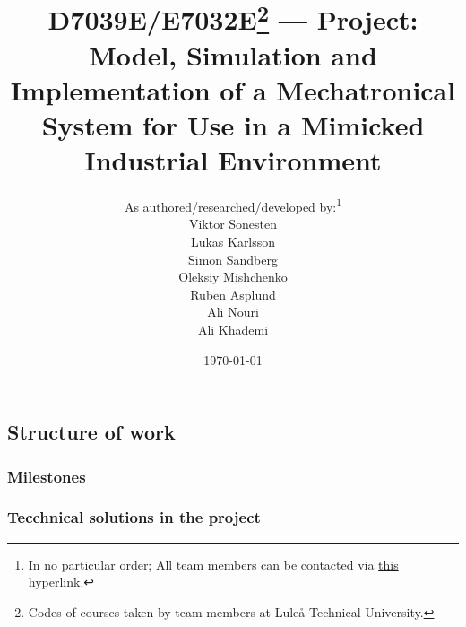 \documentclass[twocolumn]{article}
\title{
D7039E/E7032E\footnote{Codes of courses taken by team members at Luleå Technical University.}
--- Project: Model, Simulation and Implementation of a Mechatronical System for Use in a Mimicked Industrial Environment
}
\author{
As authored/researched/developed by:\footnote{In no particular order; All team members can be contacted via \href{mailto:vikson-6@student.ltu.se;lukkar-4@student.ltu.se;sansim-6@student.ltu.se;olemis-6@student.ltu.se;rubasp-6@student.ltu.se;alinou-6@student.ltu.se;alikhar-6@student.ltu.se}{this hyperlink}.} \\
Viktor Sonesten \hypermail{vikson-6@student.ltu.se} \\
Lukas Karlsson \hypermail{lukkar-4@student.ltu.se} \\
Simon Sandberg \hypermail{sansim-6@student.ltu.se} \\
Oleksiy Mishchenko \hypermail{olemis-6@student.ltu.se} \\
Ruben Asplund \hypermail{rubasp-6@student.ltu.se} \\
Ali Nouri \hypermail{alinou-6@student.ltu.se} \\
Ali Khademi \hypermail{alikha-6@student.ltu.se}
}
\date{\today}
\begin{document}
\maketitle







\appendix




\subsection{Structure of work}
\subsubsection{Milestones}
\subsubsection{Tecchnical solutions in the project}

\printbibliography
\end{document}
